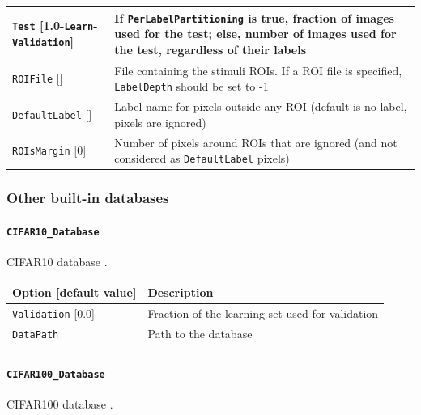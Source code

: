 \documentclass[a4paper,11pt,oneside]{article}
\begin{document}
\begin{center}
\begin{longtable}{| p{5cm} | p{10cm} | }
  \lstinline!Test! [1.0-\lstinline!Learn!-\lstinline!Validation!] & If
  \lstinline!PerLabelPartitioning! is true, fraction of images used for the
  test; else, number of images used for the test, regardless of their labels \\
 \hline
  \lstinline!ROIFile! [] & File containing the stimuli ROIs. If a ROI file is
   specified, \lstinline!LabelDepth! should be set to -1 \\
  \lstinline!DefaultLabel! [] & Label name for pixels outside any ROI (default
   is no label, pixels are ignored) \\
  \lstinline!ROIsMargin! [0] & Number of pixels around ROIs that are ignored
  (and not considered as \lstinline!DefaultLabel! pixels) \\
 \hline
\end{longtable}
\end{center}


\subsubsection{Other built-in databases}

\paragraph{\texorpdfstring{%
\lstinline[basicstyle=\ttfamily\bfseries]!CIFAR10_Database!}{CIFAR10\_Database}}
CIFAR10 database \citep{Krizhevsky2009}.

\begin{center}
 \begin{tabular}{| p{5cm} | p{10cm} | }
 \hline
 Option [default value] & Description\\
 \hline\hline
  \lstinline!Validation! [0.0] & Fraction of the learning set used for
  validation \\
  \lstinline!DataPath! & Path to the database \\
   & \\
 \hline
\end{tabular}
\end{center}

\paragraph{\texorpdfstring{%
\lstinline[basicstyle=\ttfamily\bfseries]!CIFAR100_Database!}
{CIFAR100\_Database}}
CIFAR100 database \citep{Krizhevsky2009}.
\end{document}
